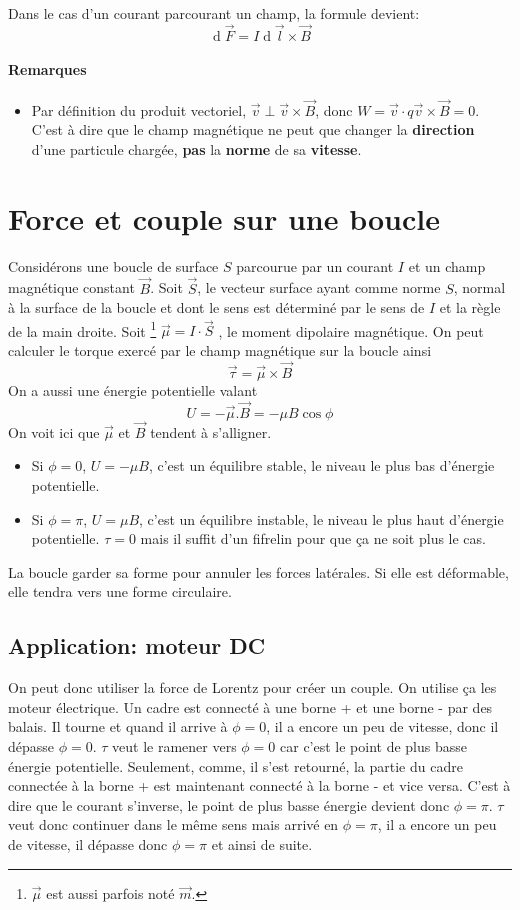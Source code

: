 \documentclass[11pt,a4paper]{article}
\newcommand{\B}{\vec B}
\DeclareMathOperator{\diff}{d}
\newcommand{\dif}{\diff\!}
\begin{document}
Dans le cas d'un courant parcourant un champ, la formule devient:
$$ \dif \vec F = I\dif \vec l \times \B $$

\paragraph{Remarques}
\begin{itemize}
	\item Par définition du produit vectoriel, $\vec v \perp \vec v \times \B$, donc $W = \vec v \cdot q\vec v \times \B = 0$.
		C'est à dire que le champ magnétique ne peut que changer la \textbf{direction} d'une particule chargée,
		\textbf{pas} la \textbf{norme} de sa \textbf{vitesse}.
\end{itemize}

\section{Force et couple sur une boucle}
Considérons une boucle de surface $S$ parcourue par un courant $I$ et un champ magnétique constant $\B$.
Soit $\vec S$, le vecteur surface ayant comme norme $S$, normal à la surface de la boucle et dont le sens est déterminé par le sens de $I$ et la règle de la main droite.
Soit
\footnote{$\vec \mu$ est aussi parfois noté $\vec m$.}
$\vec \mu = I \cdot \vec S$
, le moment dipolaire magnétique.
On peut calculer le torque exercé par le champ magnétique sur la boucle ainsi
\[ \vec \tau = \vec \mu \times \B \]
On a aussi une énergie potentielle valant
\[ U = -\vec \mu . \B = -\mu B \cos \phi \]
On voit ici que $\vec \mu$ et $\B$ tendent à s'alligner.
\begin{itemize}
	\item Si $\phi = 0$, $U = - \mu B$, c'est un équilibre stable, le niveau le plus bas d'énergie potentielle.
	\item Si $\phi = \pi$, $U = \mu B$, c'est un équilibre instable, le niveau le plus haut d'énergie potentielle.
		$\tau = 0$ mais il suffit d'un fifrelin pour que ça ne soit plus le cas.
\end{itemize}

La boucle garder sa forme pour annuler les forces latérales.
Si elle est déformable, elle tendra vers une forme circulaire.

\subsection{Application: moteur DC}
On peut donc utiliser la force de Lorentz pour créer un couple.
On utilise ça les moteur électrique.
Un cadre est connecté à une borne + et une borne - par des balais.
Il tourne et quand il arrive à $\phi = 0$, il a encore un peu de vitesse, donc il dépasse $\phi = 0$.
$\tau$ veut le ramener vers $\phi = 0$ car c'est le point de plus basse énergie potentielle.
Seulement, comme, il s'est retourné, la partie du cadre connectée à la borne + est maintenant connecté à la borne - et vice versa.
C'est à dire que le courant s'inverse, le point de plus basse énergie devient donc $\phi = \pi$.
$\tau$ veut donc continuer dans le même sens mais arrivé en $\phi = \pi$, il a encore un peu de vitesse, il dépasse donc $\phi = \pi$ et ainsi de suite.
\end{document}
